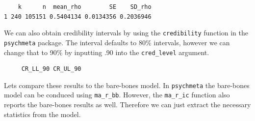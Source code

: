 \documentclass[
  letterpaper,
  DIV=11,
  numbers=noendperiod]{scrreprt}
\newenvironment{Shaded}{\begin{snugshade}}{\end{snugshade}}
\newcommand{\AttributeTok}[1]{\textcolor[rgb]{0.40,0.45,0.13}{#1}}
\newcommand{\DecValTok}[1]{\textcolor[rgb]{0.68,0.00,0.00}{#1}}
\newcommand{\FunctionTok}[1]{\textcolor[rgb]{0.28,0.35,0.67}{#1}}
\newcommand{\NormalTok}[1]{\textcolor[rgb]{0.00,0.23,0.31}{#1}}
\newcommand{\SpecialCharTok}[1]{\textcolor[rgb]{0.37,0.37,0.37}{#1}}
\newcommand{\StringTok}[1]{\textcolor[rgb]{0.13,0.47,0.30}{#1}}
\begin{document}
\begin{verbatim}
    k      n  mean_rho        SE    SD_rho
1 240 105151 0.5404134 0.0134356 0.2036946
\end{verbatim}

We can also obtain credibility intervals by using the
\texttt{credibility} function in the \texttt{psychmeta} package. The
interval defaults to 80\% intervals, however we can change that to 90\%
by inputting .90 into the \texttt{cred\_level} argument.

\begin{Shaded}
\end{Shaded}

\begin{verbatim}
     CR_LL_90 CR_UL_90
\end{verbatim}

Lets compare these results to the bare-bones model. In
\texttt{psychmeta} the bare-bones model can be conduced using
\texttt{ma\_r\_bb}. However, the \texttt{ma\_r\_ic} function also
reports the bare-bones results as well. Therefore we can just extract
the necessary statistics from the model.

\begin{Shaded}
\end{Shaded}
\end{document}
